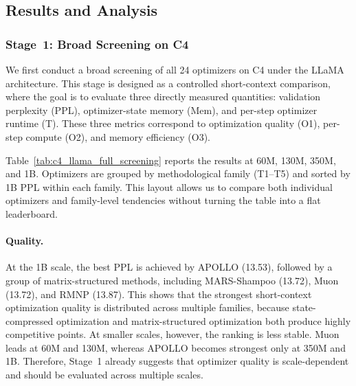 \subsection{Results and Analysis}
\label{sec:benchmark-main-results}

\subsubsection{Stage~1: Broad Screening on C4}
\label{sec:benchmark-stage1}

We first conduct a broad screening of all 24 optimizers on C4 under the
LLaMA architecture. This stage is designed as a controlled short-context
comparison, where the goal is to evaluate three directly measured quantities:
validation perplexity (PPL), optimizer-state memory (Mem), and per-step
optimizer runtime (T). These three metrics correspond to optimization quality
(O1), per-step compute (O2), and memory efficiency (O3). 

Table~\ref{tab:c4_llama_full_screening} reports the results at 60M, 130M,
350M, and 1B. Optimizers are grouped by methodological family (T1--T5) and
sorted by 1B PPL within each family. This layout allows us to compare both
individual optimizers and family-level tendencies without turning the table
into a flat leaderboard.



\paragraph{Quality.}
At the 1B scale, the best PPL is achieved by APOLLO (13.53), followed by a
group of matrix-structured methods, including MARS-Shampoo (13.72), Muon
(13.72), and RMNP (13.87). This shows that the strongest short-context
optimization quality is distributed across multiple families, because state-compressed
optimization and matrix-structured optimization both produce highly competitive
points. At smaller scales, however, the ranking is less stable. Muon leads at
60M and 130M, whereas APOLLO becomes strongest only at 350M and 1B. Therefore,
Stage~1 already suggests that optimizer quality is scale-dependent and should be
evaluated across multiple scales.

